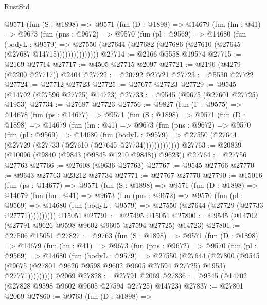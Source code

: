 \begin{lexlean}{RustStd}
\begin{coremodule}
        @9571
          (fun (S : @1898) =>
          @9571
            (fun (D : @1898) =>
            @14679
              (fun (hn : @41) =>
              @9673
                (fun (pns : @9672) =>
                @9570
                  (fun (pl : @9569) =>
                  @14680
                    (fun (bodyL : @9579) =>
                    @27550 (@27644 (@27682 (@27686 (@27610 (@27645 (@27687 @14715)))))))))))))))
@27714 := @2166 @5558 @19574
@27715 := @2169 @27714
@27717 := @4505 @27715 @2097
@27721 := @2196 (@4279 (@2200 @27717)) @2404
@27722 := @20792 @27721
@27723 := @5530 @27722
@27724 := @27712 @27723
@27725 := @27677 @27723
@27729 := @9545 (@14702 (@27596 @27725) @14723)
@27733 := @9545 (@9675 (@27601 @27725) @1953)
@27734 := @27687 @27723
@27756 := @9827
    (fun (Γ : @9575) =>
    @14678
      (fun (ps : @14677) =>
      @9571
        (fun (S : @1898) =>
        @9571
          (fun (D : @1898) =>
          @14679
            (fun (hn : @41) =>
            @9673
              (fun (pns : @9672) =>
              @9570
                (fun (pl : @9569) =>
                @14680
                  (fun (bodyL : @9579) =>
                  @27550 (@27644 (@27729 (@27733 (@27610 (@27645 @27734)))))))))))))
@27763 := @20839 (@10096 (@9840 (@9843 (@9845 @1210 @9848)) @9623))
@27764 := @27756 @27763
@27766 := @27608 (@9636 @27763)
@27767 := @9545 @27766
@27770 := @9643 @27763 @23212 @27734
@27771 := @27767 @27770
@27790 := @15016
    (fun (ps : @14677) =>
    @9571
      (fun (S : @1898) =>
      @9571
        (fun (D : @1898) =>
        @14679
          (fun (hn : @41) =>
          @9673
            (fun (pns : @9672) =>
            @9570
              (fun (pl : @9569) =>
              @14680 (fun (bodyL : @9579) => @27550 (@27644 (@27729 (@27733 @27771))))))))))
    @15051
@27791 := @27495 @15051
@27800 := @9545 (@14702 (@27791 @9626 @9598 @9602 @9605 @27594 @27725) @14723)
@27801 := @27506 @15051
@27827 := @9763
    (fun (S : @1898) =>
    @9571
      (fun (D : @1898) =>
      @14679
        (fun (hn : @41) =>
        @9673
          (fun (pns : @9672) =>
          @9570
            (fun (pl : @9569) =>
            @14680
              (fun (bodyL : @9579) =>
              @27550
                (@27644
                  (@27800
                    (@9545
                      (@9675 (@27801 @9626 @9598 @9602 @9605 @27594 @27725) @1953)
                      @27771)))))))))
    @2069
@27828 := @27791 @2069
@27836 := @9545 (@14702 (@27828 @9598 @9602 @9605 @27594 @27725) @14723)
@27837 := @27801 @2069
@27860 := @9763
    (fun (D : @1898) =>

\end{coremodule}
\end{lexlean}
